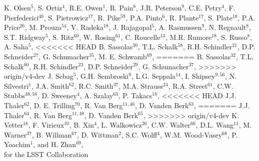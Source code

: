 {K. Olsen$^5$, 
S. Ortiz$^4$, 
R.E. Owen$^1$,
R. Pain$^{8}$,
J.R. Peterson$^{9}$,
C.E. Petry$^{4}$,  
F. Pierfederici$^{40}$,
S. Pietrowicz$^{17}$,
R. Pike$^{59}$,
P.A. Pinto$^{6}$,   
R. Plante$^{17}$,
S. Plate$^{18}$, 
P.A. Price$^{26}$,
M. Prouza$^{54}$,
V. Radeka$^{18}$, 
J. Rajagopal$^5$,   
A. Rasmussen$^9$,
N. Regnault$^8$,  
S.T. Ridgway$^5$, 
S. Ritz$^{60}$, 
W. Rosing$^{61}$,
C. Roucelle$^{13}$, 
M.R. Rumore$^{18}$, 
S. Russo$^8$,  
A. Saha$^{5}$,     
<<<<<<< HEAD
B. Sassolas$^{30}$, 
T.L. Schalk$^{58}$,     
R.H. Schindler$^{21}$,
D.P. Schneider$^{27}$,    
G. Schumacher$^{35}$,
M. E. Schwamb$^{69}$,
=======
B. Sassolas$^{32}$, 
T.L. Schalk$^{60}$,     
R.H. Schindler$^{23}$,
D.P. Schneider$^{29}$,    
G. Schumacher$^{37}$,
>>>>>>> origin/v4-dev
J. Sebag$^5$,
G.H. Sembroski$^9$, 
L.G. Seppala$^{14}$,
I. Shipsey$^{9,56}$,
N. Silvestri$^1$,
J.A. Smith$^{62}$,    
R.C. Smith$^{37}$,
M.A. Strauss$^{24}$,     
R.A. Street$^{61}$,     
C.W. Stubbs$^{38,58}$,
D. Sweeney$^4$,
A. Szalay$^{63}$,
P. Takacs$^{18}$, 
<<<<<<< HEAD
J.J. Thaler$^{62}$,
D. E. Trilling$^{70}$,
R. Van Berg$^{11,46}$, 
D. Vanden Berk$^{63}$,  
=======
J.J. Thaler$^{64}$,
R. Van Berg$^{11,48}$, 
D. Vanden Berk$^{65}$,  
>>>>>>> origin/v4-dev
K. Vetter$^{18}$, 
F. Virieux$^{10}$, 
B. Xin$^4$,
L. Walkowicz$^{26}$,
C.W. Walter$^{66}$, 
D.L. Wang$^{11}$,
M. Warner$^{37}$,
B. Willman$^{67}$,
D. Wittman$^2$,
S.C. Wolff$^4$, 
W.M. Wood-Vasey$^{68}$,  
P. Yoachim$^1$,
and H. Zhan$^{69}$, \\
for the LSST Collaboration
}
\affil{}

